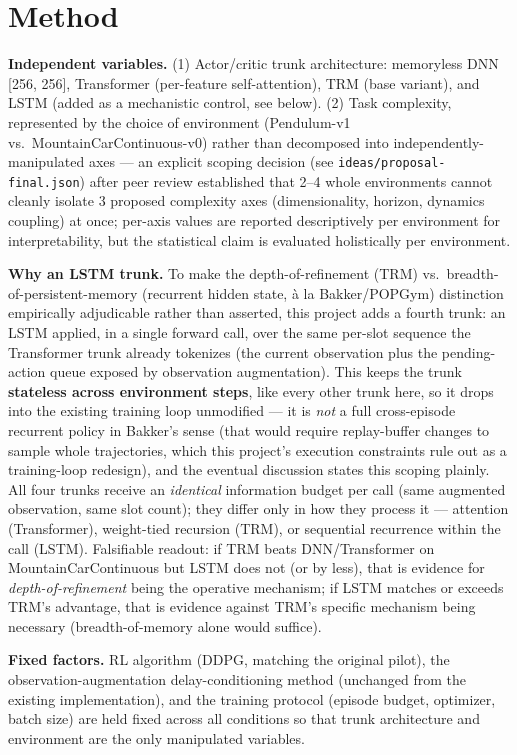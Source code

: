 \documentclass[11pt]{article}
\begin{document}
\section{Method}
\label{sec:method}

\textbf{Independent variables.} (1) Actor/critic trunk architecture: memoryless DNN [256, 256], Transformer (per-feature self-attention), TRM (base variant), and LSTM (added as a mechanistic control, see below). (2) Task complexity, represented by the choice of environment (Pendulum-v1 vs.\ MountainCarContinuous-v0) rather than decomposed into independently-manipulated axes --- an explicit scoping decision (see \texttt{ideas/proposal-final.json}) after peer review established that 2--4 whole environments cannot cleanly isolate 3 proposed complexity axes (dimensionality, horizon, dynamics coupling) at once; per-axis values are reported descriptively per environment for interpretability, but the statistical claim is evaluated holistically per environment.

\textbf{Why an LSTM trunk.} To make the depth-of-refinement (TRM) vs.\ breadth-of-persistent-memory (recurrent hidden state, \`{a} la Bakker/POPGym) distinction empirically adjudicable rather than asserted, this project adds a fourth trunk: an LSTM applied, in a single forward call, over the same per-slot sequence the Transformer trunk already tokenizes (the current observation plus the pending-action queue exposed by observation augmentation). This keeps the trunk \textbf{stateless across environment steps}, like every other trunk here, so it drops into the existing training loop unmodified --- it is \emph{not} a full cross-episode recurrent policy in Bakker's sense (that would require replay-buffer changes to sample whole trajectories, which this project's execution constraints rule out as a training-loop redesign), and the eventual discussion states this scoping plainly. All four trunks receive an \emph{identical} information budget per call (same augmented observation, same slot count); they differ only in how they process it --- attention (Transformer), weight-tied recursion (TRM), or sequential recurrence within the call (LSTM). Falsifiable readout: if TRM beats DNN/Transformer on MountainCarContinuous but LSTM does not (or by less), that is evidence for \emph{depth-of-refinement} being the operative mechanism; if LSTM matches or exceeds TRM's advantage, that is evidence against TRM's specific mechanism being necessary (breadth-of-memory alone would suffice).

\textbf{Fixed factors.} RL algorithm (DDPG, matching the original pilot), the observation-augmentation delay-conditioning method (unchanged from the existing implementation), and the training protocol (episode budget, optimizer, batch size) are held fixed across all conditions so that trunk architecture and environment are the only manipulated variables.
\end{document}
